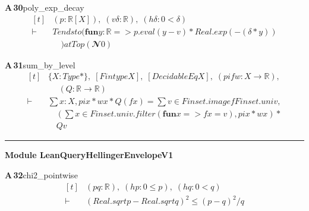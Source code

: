 \documentclass[conference]{IEEEtran}
\theoremstyle{definition}
\newcommand{\lean}[1]{\textsf{\footnotesize #1}}
\begin{document}
\noindent\textbf{A\,30}\quad\lean{poly\_exp\_decay}
{\footnotesize\[ \begin{aligned}[t]
&(\mathit{p} : \mathbb{R} [\mathit{X}]),\; (\mathit{v} \delta : \mathbb{R} ),\; (\mathit{hδ} : 0 < \delta )\\
\vdash\;&\mathit{Tendsto} (\mathbf{fun} \mathit{y} : \mathbb{R} => \mathit{p}.\mathit{eval} (\mathit{y} - \mathit{v}) * \mathit{Real}.\mathit{exp} (-(\delta * \mathit{y}))\\
&\quad ) \mathit{atTop} (𝓝 0)
\end{aligned} \]}

\noindent\textbf{A\,31}\quad\lean{sum\_by\_level}
{\footnotesize\[ \begin{aligned}[t]
&\{ \mathit{X} : \mathit{Type}*\},\; [\mathit{Fintype} \mathit{X}],\; [\mathit{DecidableEq} \mathit{X}],\; (\mathit{pi} \mathit{f} \mathit{w} : \mathit{X} \to \mathbb{R} ),\\
&\quad \; (\mathit{Q} : \mathbb{R} \to \mathbb{R} )\\
\vdash\;&\textstyle\sum \mathit{x} : \mathit{X}, \mathit{pi} \mathit{x} * \mathit{w} \mathit{x} * \mathit{Q} (\mathit{f} \mathit{x}) = \textstyle\sum \mathit{v} \in \mathit{Finset}.\mathit{image} \mathit{f} \mathit{Finset}.\mathit{univ},\\
&\quad (\textstyle\sum \mathit{x} \in \mathit{Finset}.\mathit{univ}.\mathit{filter} (\mathbf{fun} \mathit{x} => \mathit{f} \mathit{x} = \mathit{v}), \mathit{pi} \mathit{x} * \mathit{w} \mathit{x}) *\\
&\quad \mathit{Q} \mathit{v}
\end{aligned} \]}

\vspace{4pt}\noindent\rule{\columnwidth}{0.4pt}\par\vspace{2pt}
\noindent\textbf{Module \lean{LeanQueryHellingerEnvelopeV1}}\par\vspace{3pt}

\noindent\textbf{A\,32}\quad\lean{chi2\_pointwise}
{\footnotesize\[ \begin{aligned}[t]
&(\mathit{p} \mathit{q} : \mathbb{R} ),\; (\mathit{hp} : 0 \leq \mathit{p}),\; (\mathit{hq} : 0 < \mathit{q})\\
\vdash\;&(\mathit{Real}.\mathit{sqrt} \mathit{p} - \mathit{Real}.\mathit{sqrt} \mathit{q}) ^{2} \leq (\mathit{p} - \mathit{q}) ^{2} / \mathit{q}
\end{aligned} \]}
\end{document}
